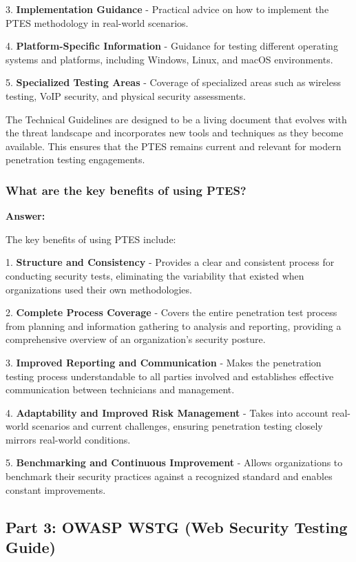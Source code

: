 \documentclass[12pt,a4paper]{article}
\begin{document}
3. \textbf{Implementation Guidance} - Practical advice on how to implement the PTES methodology in real-world scenarios.

4. \textbf{Platform-Specific Information} - Guidance for testing different operating systems and platforms, including Windows, Linux, and macOS environments.

5. \textbf{Specialized Testing Areas} - Coverage of specialized areas such as wireless testing, VoIP security, and physical security assessments.

The Technical Guidelines are designed to be a living document that evolves with the threat landscape and incorporates new tools and techniques as they become available. This ensures that the PTES remains current and relevant for modern penetration testing engagements.

\subsubsection{What are the key benefits of using PTES?}

\textbf{Answer:}

The key benefits of using PTES include: 

1. \textbf{Structure and Consistency} - Provides a clear and consistent process for conducting security tests, eliminating the variability that existed when organizations used their own methodologies.

2. \textbf{Complete Process Coverage} - Covers the entire penetration test process from planning and information gathering to analysis and reporting, providing a comprehensive overview of an organization's security posture.

3. \textbf{Improved Reporting and Communication} - Makes the penetration testing process understandable to all parties involved and establishes effective communication between technicians and management.

4. \textbf{Adaptability and Improved Risk Management} - Takes into account real-world scenarios and current challenges, ensuring penetration testing closely mirrors real-world conditions.

5. \textbf{Benchmarking and Continuous Improvement} - Allows organizations to benchmark their security practices against a recognized standard and enables constant improvements. 

\subsection{Part 3: OWASP WSTG (Web Security Testing Guide)}
\end{document}
